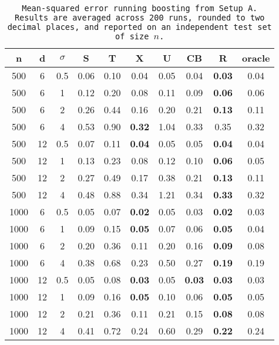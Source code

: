 \begin{table}[ht]
\centering
\begin{tabular}{cccccccccc}
  \hline
n & d & $\sigma$ & S & T & X & U & CB & R & oracle \\ 
  \hline
500 & 6 & 0.5 & 0.06 & 0.10 & 0.04 & 0.05 & 0.04 & \bf 0.03 & 0.04 \\ 
  500 & 6 & 1 & 0.12 & 0.20 & 0.08 & 0.11 & 0.09 & \bf 0.06 & 0.06 \\ 
  500 & 6 & 2 & 0.26 & 0.44 & 0.16 & 0.20 & 0.21 & \bf 0.13 & 0.11 \\ 
  500 & 6 & 4 & 0.53 & 0.90 & \bf 0.32 & 1.04 & 0.33 & 0.35 & 0.32 \\ 
  500 & 12 & 0.5 & 0.07 & 0.11 & \bf 0.04 & 0.05 & 0.05 & \bf 0.04 & 0.04 \\ 
  500 & 12 & 1 & 0.13 & 0.23 & 0.08 & 0.12 & 0.10 & \bf 0.06 & 0.05 \\ 
  500 & 12 & 2 & 0.27 & 0.49 & 0.17 & 0.38 & 0.21 & \bf 0.13 & 0.11 \\ 
  500 & 12 & 4 & 0.48 & 0.88 & 0.34 & 1.21 & 0.34 & \bf 0.33 & 0.32 \\ 
  1000 & 6 & 0.5 & 0.05 & 0.07 & \bf 0.02 & 0.05 & 0.03 & \bf 0.02 & 0.03 \\ 
  1000 & 6 & 1 & 0.09 & 0.15 & \bf 0.05 & 0.07 & 0.06 & \bf 0.05 & 0.04 \\ 
  1000 & 6 & 2 & 0.20 & 0.36 & 0.11 & 0.20 & 0.16 & \bf 0.09 & 0.08 \\ 
  1000 & 6 & 4 & 0.38 & 0.68 & 0.23 & 0.50 & 0.27 & \bf 0.19 & 0.19 \\ 
  1000 & 12 & 0.5 & 0.05 & 0.08 & \bf 0.03 & 0.05 & \bf 0.03 & \bf 0.03 & 0.03 \\ 
  1000 & 12 & 1 & 0.09 & 0.16 & \bf 0.05 & 0.10 & 0.06 & \bf 0.05 & 0.05 \\ 
  1000 & 12 & 2 & 0.21 & 0.36 & 0.11 & 0.21 & 0.15 & \bf 0.08 & 0.08 \\ 
  1000 & 12 & 4 & 0.41 & 0.72 & 0.24 & 0.60 & 0.29 & \bf 0.22 & 0.24 \\ 
   \hline
\end{tabular}
\caption{\tt Mean-squared error running \texttt{boosting} from Setup A. Results are averaged across 200 runs, rounded to two decimal places, and reported on an independent test set of size $n$.} 
\label{table:setup1}
\end{table}

